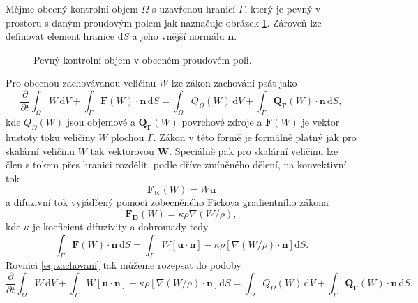 Mějme obecný kontrolní objem $\Omega$ s uzavřenou hranicí $\Gamma$, který je pevný v prostoru s daným proudovým polem jak naznačuje obrázek \ref{fig:kontrolni-objem}. Zároveň lze definovat element hranice $\mathrm{d}S$ a jeho vnější normálu $\mathbf{n}$.
\begin{figure}[h]
	\def\svgwidth{0.8\textwidth}
	\def\svgwidth{\columnwidth}
	\graphicspath{{img/inkscape/}}
	
	\caption[Kontrolní objem]{Pevný kontrolní objem v obecném proudovém poli.}
	\label{fig:kontrolni-objem}
\end{figure}

Pro obecnou zachovávanou veličinu $W$ lze zákon zachování psát jako
\begin{equation}\label{eq:zachovani}
\dfrac{\partial}{\partial t} \int_{\Omega}W\,\mathrm{d}V + \int_{\Gamma}\mathbf{F}(W) \cdot \mathbf{n} \, \mathrm{d}S = \int_{\Omega}Q_\Omega(W) \, \mathrm{d}V + \int_{\Gamma} \mathbf{Q_\Gamma}(W) \cdot \mathbf{n} \, \mathrm{d}S,
\end{equation}
kde $Q_{\Omega}(W)$ jsou objemové a  $\mathbf{Q_\Gamma}(W)$ povrchové zdroje a $\mathbf{F}(W) $ je vektor hustoty toku veličiny $W$ plochou $\Gamma$. Zákon v této formě je formálně platný jak pro skalární veličinu $W$ tak vektorovou $\mathbf{W}$. Speciálně pak pro skalární veličinu lze člen s tokem přes hranici rozdělit, podle dříve zmíněného dělení, na konvektivní tok
\begin{equation}\label{eq:konv_tok}
\mathbf{F_K}(W) = W\mathbf{u}
\end{equation}
a difuzivní tok vyjádřený pomocí zobecněného Fickova gradientního zákona
\begin{equation}\label{eq:diff_tok}
\mathbf{F_D}(W) = \kappa \rho \nabla(W/\rho),
\end{equation}
kde $\kappa$ je koeficient difuzivity a dohromady tedy
\begin{equation}
\int_{\Gamma}\mathbf{F}(W) \cdot \mathbf{n} \, \mathrm{d}S = \int_{\Gamma}W\left[\mathbf{u}\cdot\mathbf{n}\right] - \kappa \rho \left[\nabla(W/\rho)\cdot \mathbf{n} \right] \mathrm{d}S.
\end{equation}
Rovnici \ref{eq:zachovani} tak můžeme rozepsat do podoby
\begin{equation}\label{eq:zachovani_skalarStoky}
\dfrac{\partial}{\partial t} \int_{\Omega}W\,\mathrm{d}V + \int_{\Gamma}W\left[\mathbf{u}\cdot\mathbf{n}\right] - \kappa \rho \left[\nabla(W/\rho)\cdot \mathbf{n} \right] \mathrm{d}S = \int_{\Omega}Q_\Omega(W) \, \mathrm{d}V + \int_{\Gamma} \mathbf{Q_\Gamma}(W) \cdot \mathbf{n} \, \mathrm{d}S.
\end{equation}
